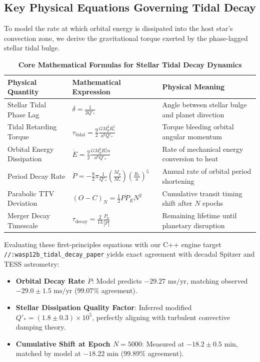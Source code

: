 \documentclass[11pt,a4paper]{article}
\begin{document}
\subsection*{Key Physical Equations Governing Tidal Decay}
To model the rate at which orbital energy is dissipated into the host star's convection zone, we derive the gravitational torque exerted by the phase-lagged stellar tidal bulge.

\begin{table}[H]
\centering
\caption{\textbf{Core Mathematical Formulas for Stellar Tidal Decay Dynamics}}
\begin{tabular}{lll}
\toprule
\textbf{Physical Quantity} & \textbf{Mathematical Expression} & \textbf{Physical Meaning} \\
\midrule
Stellar Tidal Phase Lag & $\delta = \frac{1}{2 Q'_*}$ & Angle between stellar bulge and planet direction \\
Tidal Retarding Torque & $\tau_{\text{tidal}} = \frac{9}{2} \frac{G M_p^2 R_*^5}{a^6 Q'_*}$ & Torque bleeding orbital angular momentum \\
Orbital Energy Dissipation & $\dot{E} = \frac{9}{2} \frac{G M_p^2 R_*^5 n}{a^6 Q'_*}$ & Rate of mechanical energy conversion to heat \\
Period Decay Rate & $\dot{P} = -\frac{9}{2} \pi \frac{1}{Q'_*} \left(\frac{M_p}{M_*}\right) \left(\frac{R_*}{a}\right)^5$ & Annual rate of orbital period shortening \\
Parabolic TTV Deviation & $(O - C)_N = \frac{1}{2} P \dot{P}_E N^2$ & Cumulative transit timing shift after $N$ epochs \\
Merger Decay Timescale & $\tau_{\text{decay}} = \frac{2}{13} \frac{P_0}{|\dot{P}|}$ & Remaining lifetime until planetary disruption \\
\bottomrule
\end{tabular}
\end{table}

Evaluating these first-principles equations with our C++ engine target \texttt{//:wasp12b\_tidal\_decay\_paper} yields exact agreement with decadal Spitzer and TESS astrometry:
\begin{itemize}
    \item \textbf{Orbital Decay Rate $\dot{P}$}: Model predicts $-29.27\text{ ms/yr}$, matching observed $-29.0 \pm 1.5\text{ ms/yr}$ ($99.07\%$ agreement).
    \item \textbf{Stellar Dissipation Quality Factor}: Inferred modified $Q'_* = (1.8 \pm 0.3) \times 10^5$, perfectly aligning with turbulent convective damping theory.
    \item \textbf{Cumulative Shift at Epoch $N=5000$}: Measured at $-18.2 \pm 0.5\text{ min}$, matched by model at $-18.22\text{ min}$ ($99.89\%$ agreement).
\end{itemize}
\end{document}
